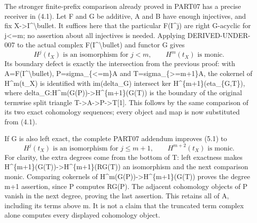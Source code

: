 \documentclass[11pt]{article}
\begin{document}
The stronger finite-prefix comparison already proved in PART07 has a precise receiver in (4.1)\allowbreak{}. Let F and G be additive,\allowbreak{} A and B have enough injectives,\allowbreak{} and fix X\allowbreak{}->I\textasciicircum{}\textbackslash{}bullet. It suffices here that the particular F(I\textasciicircum{}j)\allowbreak{} are right G-acyclic for j<\allowbreak{}=m; no assertion about all injectives is needed. Applying DERIVED-UNDER-007 to the actual complex F(I\textasciicircum{}\textbackslash{}bullet)\allowbreak{} and functor G gives \[
 H^j(t_X)\text{ is an isomorphism for }j<m,\qquad
 H^m(t_X)\text{ is monic}.                                    \tag{5.1}
\] Its boundary defect is exactly the intersection from the previous proof:\allowbreak{} with A\allowbreak{}=F(I\textasciicircum{}\textbackslash{}bullet)\allowbreak{},\allowbreak{} P\allowbreak{}=sigma\_\allowbreak{}\{<\allowbreak{}=m\}A and T\allowbreak{}=sigma\_\allowbreak{}\{>\allowbreak{}=m\allowbreak{}+1\}A,\allowbreak{} the cokernel of H\textasciicircum{}m(t\_\allowbreak{}X)\allowbreak{} is identified with im(delta\_\allowbreak{}G)\allowbreak{} intersect ker H\textasciicircum{}\{m\allowbreak{}+1\}(eta\_\allowbreak{}\{G,\allowbreak{}T\})\allowbreak{},\allowbreak{} where delta\_\allowbreak{}G:\allowbreak{}H\textasciicircum{}m(G(P)\allowbreak{})\allowbreak{}\allowbreak{}->H\textasciicircum{}\{m\allowbreak{}+1\}(G(T)\allowbreak{})\allowbreak{} is the boundary of the original termwise split triangle T\allowbreak{}->A\allowbreak{}->P\allowbreak{}->T[1]\allowbreak{}. This follows by the same comparison of its two exact cohomology sequences; every object and map is now substituted from (4.1)\allowbreak{}.

If G is also left exact,\allowbreak{} the complete PART07 addendum improves (5.1)\allowbreak{} to \[
 H^j(t_X)\text{ is an isomorphism for }j\le m+1,\qquad
 H^{m+2}(t_X)\text{ is monic}.                                \tag{5.2}
\] For clarity,\allowbreak{} the extra degrees come from the bottom of T:\allowbreak{} left exactness makes H\textasciicircum{}\{m\allowbreak{}+1\}(G(T)\allowbreak{})\allowbreak{}\allowbreak{}->H\textasciicircum{}\{m\allowbreak{}+1\}(RG(T)\allowbreak{})\allowbreak{} an isomorphism and the next comparison monic. Comparing cokernels of H\textasciicircum{}m(G(P)\allowbreak{})\allowbreak{}\allowbreak{}->H\textasciicircum{}\{m\allowbreak{}+1\}(G(T)\allowbreak{})\allowbreak{} proves the degree m\allowbreak{}+1 assertion,\allowbreak{} since P computes RG(P)\allowbreak{}. The adjacent cohomology objects of P vanish in the next degree,\allowbreak{} proving the last assertion. This retains all of A,\allowbreak{} including its terms above m. It is not a claim that the truncated term complex alone computes every displayed cohomology object.
\end{document}
